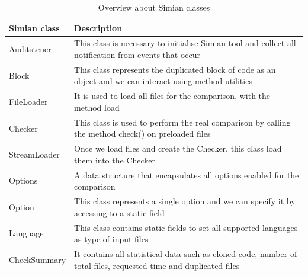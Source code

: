 \begin{table}[!h]
	\begin{tabular}{|p{3.0cm}|p{10.4cm}|}\hline
	\textbf{Simian class} & \textbf{Description} \\\hline
	Auditstener &  This class is necessary to initialise Simian tool  and collect all notification from events that occur \\\hline
	Block &  This class represents the duplicated block of code as an object  and we can interact using method utilities \\\hline
	FileLoader &   It is used to load all files  for the comparison, with the method load \\ \hline
	Checker &   This class is used to perform the real comparison  by calling the method check() on preloaded files \\\hline
	StreamLoader &   Once we load files and create the Checker,  this class load them into the Checker \\\hline
	Options &   A data structure that encapsulates  all options enabled for the comparison \\\hline
	Option &   This class represents a single option  and we can specify it by accessing to a static field \\\hline
	Language &   This class contains static fields  to set all supported languages as type of input files \\\hline
	CheckSummary &   It contains all statistical data such as cloned code,  number of total files, requested time and duplicated files \\\hline
\end{tabular}
\caption{ Overview about Simian classes }\label{Table:4}
\end{table} 


